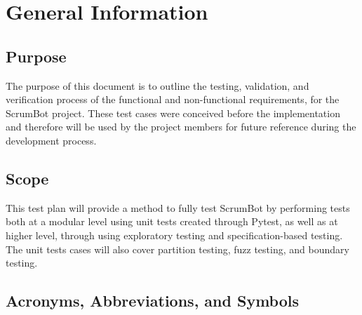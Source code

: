 \documentclass[12pt, titlepage]{article}
\begin{document}
\section{General Information}

\subsection{Purpose}
The purpose of this document is to outline the testing, validation, and verification process of the functional and non-functional requirements, for the ScrumBot project. These test cases were conceived before the implementation and therefore will be used by the project members for future reference during the development process.

\subsection{Scope}
This test plan will provide a method to fully test ScrumBot by performing tests both at a modular level using unit tests created through Pytest, as well as at higher level, through using exploratory testing and specification-based testing. The unit tests cases will also cover partition testing, fuzz testing, and boundary testing.

\subsection{Acronyms, Abbreviations, and Symbols}
	
\end{document}
